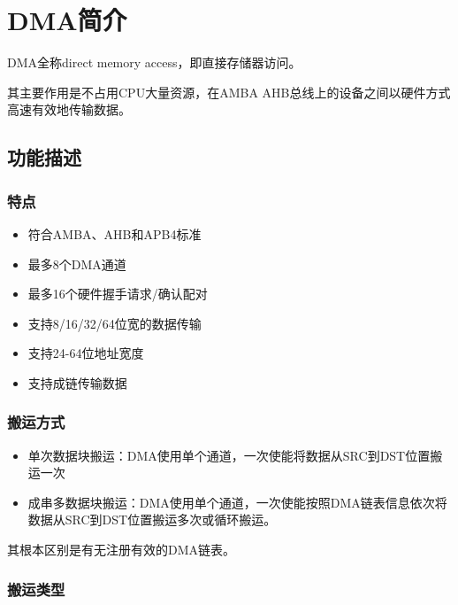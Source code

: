 \documentclass[
  12pt,
]{book}
\begin{document}
\hypertarget{ch-dma}{%
\chapter{DMA简介}\label{ch-dma}}

DMA全称direct memory access，即直接存储器访问。

其主要作用是不占用CPU大量资源，在AMBA AHB总线上的设备之间以硬件方式高速有效地传输数据。

\hypertarget{ux529fux80fdux63cfux8ff0-1}{%
\section{功能描述}\label{ux529fux80fdux63cfux8ff0-1}}

\hypertarget{ux7279ux70b9-1}{%
\subsection{特点}\label{ux7279ux70b9-1}}

\begin{itemize}
\item
  符合AMBA、AHB和APB4标准
\item
  最多8个DMA通道
\item
  最多16个硬件握手请求/确认配对
\item
  支持8/16/32/64位宽的数据传输
\item
  支持24-64位地址宽度
\item
  支持成链传输数据
\end{itemize}

\hypertarget{ux642cux8fd0ux65b9ux5f0f}{%
\subsection{搬运方式}\label{ux642cux8fd0ux65b9ux5f0f}}

\begin{itemize}
\item
  单次数据块搬运：DMA使用单个通道，一次使能将数据从SRC到DST位置搬运一次
\item
  成串多数据块搬运：DMA使用单个通道，一次使能按照DMA链表信息依次将数据从SRC到DST位置搬运多次或循环搬运。
\end{itemize}

其根本区别是有无注册有效的DMA链表。

\hypertarget{ux642cux8fd0ux7c7bux578b}{%
\subsection{搬运类型}\label{ux642cux8fd0ux7c7bux578b}}
\end{document}

